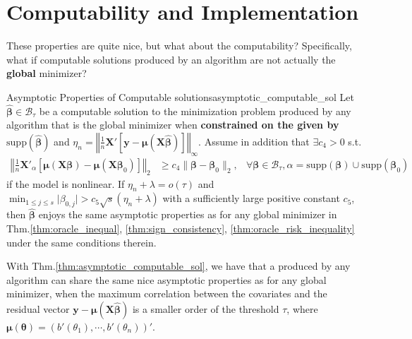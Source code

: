 \documentclass[twoside]{article}
\begin{document}
\section{Computability and Implementation}
These properties are quite nice, but what about the computability? Specifically, what if computable solutions produced by an algorithm are not actually the \textbf{global} minimizer?
\begin{theorem}{Asymptotic Properties of Computable solutions}{asymptotic_computable_sol}
    Let $\hat{\boldsymbol{\beta}} \in \mathcal{B}_{\tau}$ be a computable solution to the minimization problem produced by any algorithm that is the global minimizer when \textbf{constrained on the  given by} $\mathrm{supp}\left( \hat{\boldsymbol{\beta}} \right)$ and $\eta_n =\left\Vert \frac{1}{n}\mathbf{X}'\left[\mathbf{y}-\boldsymbol{\mu}\left( \mathbf{X}\hat{\boldsymbol{\beta}} \right)\right] \right\Vert _{\infty}$.
    Assume in addition that $\exists c_4 >0$ s.t. 
    \begin{align*}
        \left\Vert \frac{1}{n}\mathbf{X}'_{\alpha}\left[ \boldsymbol{\mu}\left( \mathbf{X}\boldsymbol{\beta} \right)-\boldsymbol{\mu}\left( \mathbf{X}\boldsymbol{\beta}_0 \right)\right] \right\Vert _2 & \geq c_4 \lVert \boldsymbol{\beta}-\boldsymbol{\beta}_0\rVert _2, & \forall \boldsymbol{\beta}\in\mathcal{B}_{\tau},\alpha = \mathrm{supp}\left( \boldsymbol{\beta} \right) \cup  \mathrm{supp}\left( \boldsymbol{\beta}_0 \right)
    \end{align*}
    if the model is nonlinear. If $\eta_n + \lambda = o(\tau)$ and $\min_{1\leq j\leq s}\lvert \beta_{0,j}\rvert > c_5 \sqrt{s}(\eta_n+\lambda)$ with a sufficiently large positive constant $c_5$, then $\hat{\boldsymbol{\beta}}$ enjoys the same asymptotic properties as for any global minimizer in Thm.\ref{thm:oracle_inequal}, \ref{thm:sign_consistency}, \ref{thm:oracle_risk_inequality} under the same conditions therein.
\end{theorem}
With Thm.\ref{thm:asymptotic_computable_sol}, we have that a  produced by any algorithm can share the same nice asymptotic properties as for any global minimizer, when the maximum correlation between the covariates and the residual vector $\mathbf{y}-\boldsymbol{\mu}\left( \mathbf{X}\hat{\boldsymbol{\beta}} \right)$ is a smaller order of the threshold $\tau$, where $\boldsymbol{\mu}(\boldsymbol{\theta}) = \left( b'(\theta_1),\cdots,b'(\theta_n) \right)'$.
\end{document}
